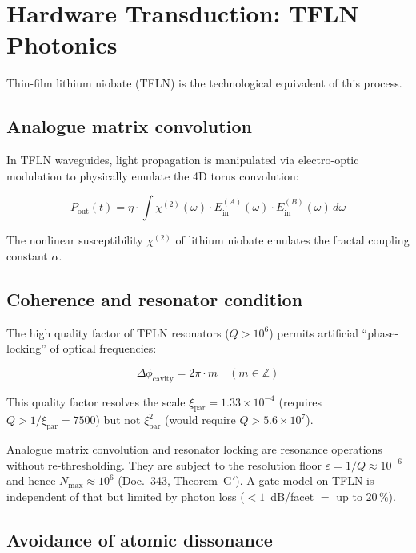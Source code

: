 	\section{Hardware Transduction: TFLN Photonics}
	
	Thin-film lithium niobate (TFLN) is the technological equivalent of this process.
	
	\subsection{Analogue matrix convolution}
	
	In TFLN waveguides, light propagation is manipulated via electro-optic modulation to physically emulate the 4D torus convolution:
	
	\begin{equation}
		P_{\text{out}}(t) = \eta \cdot \int \chi^{(2)}(\omega) \cdot E_{\text{in}}^{(A)}(\omega) \cdot E_{\text{in}}^{(B)}(\omega) \, d\omega
	\end{equation}
	
	The nonlinear susceptibility $\chi^{(2)}$ of lithium niobate emulates the fractal coupling constant $\alpha$.
	
	\subsection{Coherence and resonator condition}
	
	The high quality factor of TFLN resonators ($Q > 10^6$) permits artificial ``phase-locking'' of optical frequencies:
	
	\begin{equation}
		\Delta \phi_{\text{cavity}} = 2\pi \cdot m \quad (m \in \mathbb{Z})
	\end{equation}
	
	This quality factor resolves the scale $\xi_{\text{par}} = 1.33\times10^{-4}$ (requires $Q > 1/\xi_{\text{par}} = 7500$) but not $\xi_{\text{par}}^2$ (would require $Q > 5.6\times10^{7}$).
	
	Analogue matrix convolution and resonator locking are resonance operations without re-thresholding. They are subject to the resolution floor $\varepsilon = 1/Q \approx 10^{-6}$ and hence $N_\mathrm{max} \approx 10^{6}$ (Doc.~343, Theorem~G$'$). A gate model on TFLN is independent of that but limited by photon loss ($<1$~dB/facet $=$ up to $20\,\%$).
	
	\subsection{Avoidance of atomic dissonance}
	
